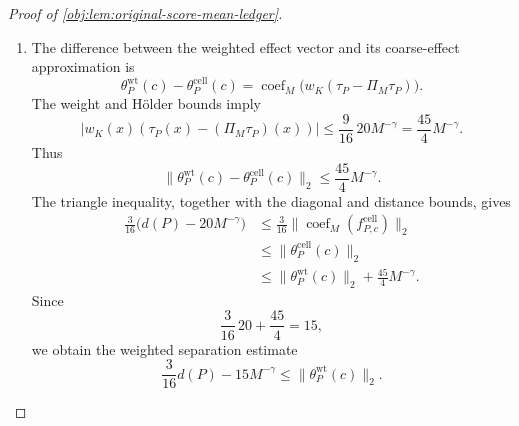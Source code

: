 \begin{proof}[Proof of \cref{obj:lem:original-score-mean-ledger}]
\begin{enumerate}
The Hölder estimate applied using
\cref{obj:ass:effect-smoothness} gives
\[
\left|f^{\mathrm{raw}}_{P,c}(x)-(\Pi_Mf^{\mathrm{raw}}_{P,c})(x)\right|
=
|\tau_P(x)-(\Pi_M\tau_P)(x)|
\le20M^{-\gamma}.
\]
Since \(\lambda\) is a probability measure,
\[
\int_0^1
\bigl(f^{\mathrm{raw}}_{P,c}-\Pi_Mf^{\mathrm{raw}}_{P,c}\bigr)^2
\,d\lambda
\le(20M^{-\gamma})^2.
\]
On the other hand, expansion around the mean gives
\[
\begin{aligned}
\int_0^1(\tau_P(x)-c)^2\,d\lambda(x)
&=\int_0^1\tau_P(x)^2\,d\lambda(x)-2c\bar\tau_P+c^2\\
&=d(P)^2+(\bar\tau_P-c)^2
\ge d(P)^2.
\end{aligned}
\]
Combining these displays yields
\[
d(P)^2
\le
\|\operatorname{coef}_M(f^{\mathrm{cell}}_{P,c})\|_2^2
+(20M^{-\gamma})^2
\le
\left(
\|\operatorname{coef}_M(f^{\mathrm{cell}}_{P,c})\|_2
+20M^{-\gamma}
\right)^2.
\]
Both sides inside the last square are nonnegative, so
\[
d(P)-20M^{-\gamma}
\le
\|\operatorname{coef}_M(f^{\mathrm{cell}}_{P,c})\|_2.
\]

\item
The difference between the weighted effect vector and its coarse-effect approximation is
\[
\theta^{\mathrm{wt}}_P(c)-\theta^{\mathrm{cell}}_P(c)
=
\operatorname{coef}_M\bigl(w_K(\tau_P-\Pi_M\tau_P)\bigr).
\]
The weight and Hölder bounds imply
\[
|w_K(x)(\tau_P(x)-(\Pi_M\tau_P)(x))|
\le
\frac9{16}\,20M^{-\gamma}
=
\frac{45}{4}M^{-\gamma}.
\]
Thus
\[
\|\theta^{\mathrm{wt}}_P(c)-\theta^{\mathrm{cell}}_P(c)\|_2
\le\frac{45}{4}M^{-\gamma}.
\]
The triangle inequality, together with the diagonal and distance bounds, gives
\[
\begin{aligned}
\frac3{16}\bigl(d(P)-20M^{-\gamma}\bigr)
&\le
\frac3{16}\|\operatorname{coef}_M(f^{\mathrm{cell}}_{P,c})\|_2\\
&\le\|\theta^{\mathrm{cell}}_P(c)\|_2\\
&\le
\|\theta^{\mathrm{wt}}_P(c)\|_2
+\frac{45}{4}M^{-\gamma}.
\end{aligned}
\]
Since
\[
\frac3{16}\,20+\frac{45}{4}=15,
\]
we obtain the weighted separation estimate
\[
\frac3{16}d(P)-15M^{-\gamma}
\le\|\theta^{\mathrm{wt}}_P(c)\|_2.
\]


\end{enumerate}
\end{proof}
